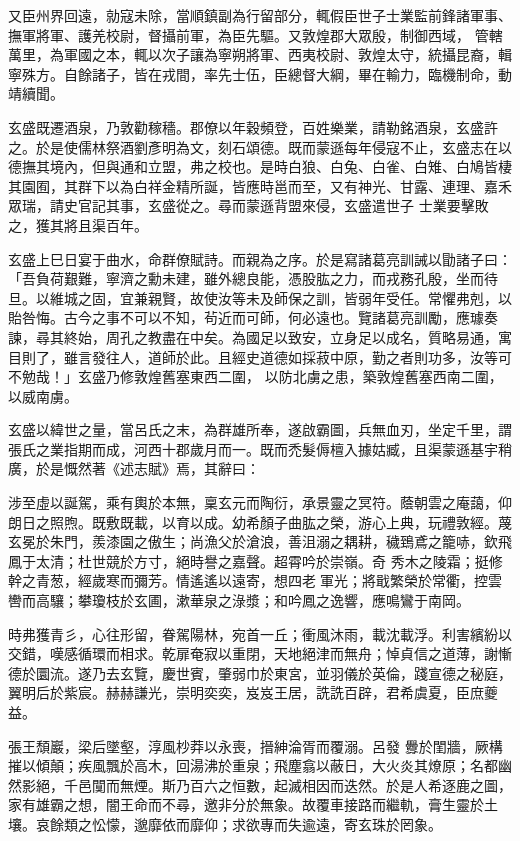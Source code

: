 \begin{pinyinscope}
 又臣州界回遠，勍寇未除，當順鎮副為行留部分，輒假臣世子士業監前鋒諸軍事、撫軍將軍、護羌校尉，督攝前軍，為臣先驅。又敦煌郡大眾殷，制御西域，
 管轄萬里，為軍國之本，輒以次子讓為寧朔將軍、西夷校尉、敦煌太守，統攝昆裔，輯寧殊方。自餘諸子，皆在戎間，率先士伍，臣總督大綱，畢在輸力，臨機制命，動靖續聞。



 玄盛既遷酒泉，乃敦勸稼穡。郡僚以年穀頻登，百姓樂業，請勒銘酒泉，玄盛許之。於是使儒林祭酒劉彥明為文，刻石頌德。既而蒙遜每年侵寇不止，玄盛志在以德撫其境內，但與通和立盟，弗之校也。是時白狼、白兔、白雀、白雉、白鳩皆棲其園囿，其群下以為白祥金精所誕，皆應時邕而至，又有神光、甘露、連理、嘉禾眾瑞，請史官記其事，玄盛從之。尋而蒙遜背盟來侵，玄盛遣世子
 士業要擊敗之，獲其將且渠百年。



 玄盛上巳日宴于曲水，命群僚賦詩。而親為之序。於是寫諸葛亮訓誡以勖諸子曰：「吾負荷艱難，寧濟之勳未建，雖外總良能，憑股肱之力，而戎務孔殷，坐而待旦。以維城之固，宜兼親賢，故使汝等未及師保之訓，皆弱年受任。常懼弗剋，以貽咎悔。古今之事不可以不知，茍近而可師，何必遠也。覽諸葛亮訓勵，應璩奏諫，尋其終始，周孔之教盡在中矣。為國足以致安，立身足以成名，質略易通，寓目則了，雖言發往人，道師於此。且經史道德如採菽中原，勤之者則功多，汝等可不勉哉！」玄盛乃修敦煌舊塞東西二圍，
 以防北虜之患，築敦煌舊塞西南二圍，以威南虜。



 玄盛以緯世之量，當呂氏之末，為群雄所奉，遂啟霸圖，兵無血刃，坐定千里，謂張氏之業指期而成，河西十郡歲月而一。既而禿髮傉檀入據姑臧，且渠蒙遜基宇稍廣，於是慨然著《述志賦》焉，其辭曰：



 涉至虛以誕駕，乘有輿於本無，稟玄元而陶衍，承景靈之冥符。蔭朝雲之庵藹，仰朗日之照煦。既敷既載，以育以成。幼希顏子曲肱之榮，游心上典，玩禮敦經。蔑玄冕於朱門，羨漆園之傲生；尚漁父於滄浪，善沮溺之耦耕，穢鵄鳶之籠哧，欽飛鳳于太清；杜世競於方寸，絕時譽之嘉聲。超霄吟於崇嶺。奇
 秀木之陵霜；挺修幹之青葱，經歲寒而彌芳。情遙遙以遠寄，想四老軍光；將戢繁榮於常衢，控雲轡而高驤；攀瓊枝於玄圃，漱華泉之淥漿；和吟鳳之逸響，應鳴鸞于南岡。



 時弗獲青彡，心往形留，眷駕陽林，宛首一丘；衝風沐雨，載沈載浮。利害繽紛以交錯，嘆感循環而相求。乾扉奄寂以重閉，天地絕津而無舟；悼貞信之道薄，謝慚德於圜流。遂乃去玄覽，慶世賓，肇弱巾於東宮，並羽儀於英倫，踐宣德之秘庭，翼明后於紫宸。赫赫謙光，崇明奕奕，岌岌王居，詵詵百辟，君希虞夏，臣庶夔益。



 張王頹巖，梁后墜壑，淳風杪莽以永喪，搢紳淪胥而覆溺。呂發
 釁於閨牆，厥構摧以傾顛；疾風飄於高木，回湯沸於重泉；飛塵翕以蔽日，大火炎其燎原；名都幽然影絕，千邑闃而無煙。斯乃百六之恒數，起滅相因而迭然。於是人希逐鹿之圖，家有雄霸之想，闇王命而不尋，邀非分於無象。故覆車接路而繼軌，膏生靈於土壤。哀餘類之忪懞，邈靡依而靡仰；求欲專而失逾遠，寄玄珠於罔象。




\end{pinyinscope}

